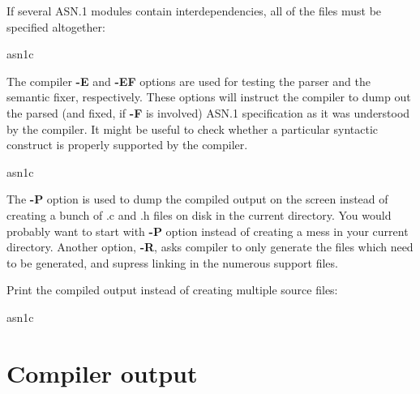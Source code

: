 \documentclass[english,oneside,12pt]{book}
\begin{document}
If several ASN.1 modules contain interdependencies, all of the files
must be specified altogether:
\begin{bash}
asn1c %
\end{bash}
The compiler \textbf{-E} and \textbf{-EF} options are used for testing
the parser and the semantic fixer, respectively. These options will
instruct the compiler to dump out the parsed (and fixed, if \textbf{-F}
is involved) ASN.1 specification as it was understood
by the compiler. It might be useful to check whether a particular
syntactic construct is properly supported by the compiler.
\begin{bash}
asn1c %
\end{bash}
The \textbf{-P} option is used to dump the compiled output on the
screen instead of creating a bunch of .c and .h files on disk in the
current directory. You would probably want to start with \textbf{-P}
option instead of creating a mess in your current directory. Another
option, \textbf{-R}, asks compiler to only generate the files which
need to be generated, and supress linking in the numerous support
files.

Print the compiled output instead of creating multiple source files:
\begin{bash}
asn1c %
\end{bash}

\clearpage{}
\section{Compiler output}
\end{document}
